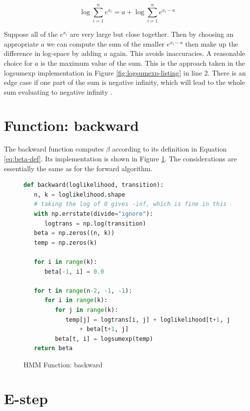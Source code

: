 \begin{equation}
\log \sum_{i=1}^{n} e^{x_{i}}=a+\log \sum_{i=1}^{n} e^{x_{i}-a}
\end{equation}

Suppose all of the $e^{x_i}$ are very large but close together. Then by choosing an appropriate $a$ we can compute the sum of the smaller $e^{x_i-a}$ then make up the difference in log-space by adding $a$ again. This avoids inaccuracies. A reasonable choice for $a$ is the maximum value of the sum. This is the approach taken in the logsumexp implementation in Figure \ref{fig:logsumexp-listing} in line 2. There is an edge case if one part of the sum is negative infinity, which will lead to the whole sum evaluating to negative infinity \parencite{mllecture}.


\section{Function: backward}

The backward function computes $\beta$ according to its definition in Equation \ref{eq:beta-def}. Its implementation is shown in Figure \ref{fig:hmm-backwards-listing}. The considerations are essentially the same as for the forward algorithm. 

\begin{figure}
\begin{singlespace}
\begin{lstlisting}[language=Python]
def backward(loglikelihood, transition):
   n, k = loglikelihood.shape
   # taking the log of 0 gives -inf, which is fine in this case
   with np.errstate(divide="ignore"):
      logtrans = np.log(transition)
   beta = np.zeros((n, k))
   temp = np.zeros(k)

   for i in range(k):
      beta[-1, i] = 0.0

   for t in range(n-2, -1, -1):
      for i in range(k):
         for j in range(k):
            temp[j] = logtrans[i, j] + loglikelihood[t+1, j] \
                + beta[t+1, j]
         beta[t, i] = logsumexp(temp)
   return beta
\end{lstlisting}
\end{singlespace}
\caption{HMM Function: backward}    
\label{fig:hmm-backwards-listing}
\end{figure}

\section{E-step}

